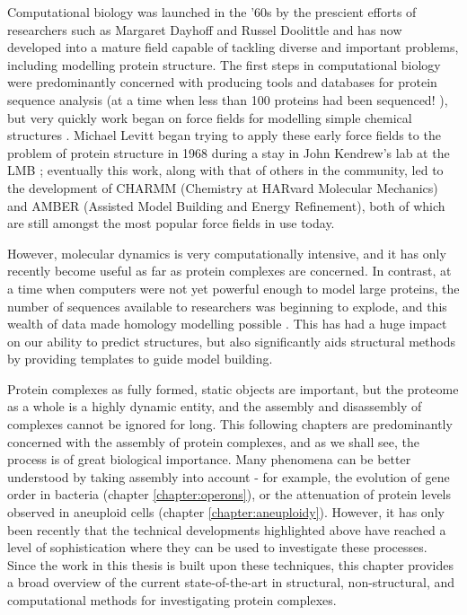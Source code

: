 \documentclass[a4paper,11pt,twoside,openright]{scrbook}
\begin{document}
Computational biology was launched in the '60s by the prescient efforts of researchers such as Margaret Dayhoff and Russel Doolittle and has now developed into a mature field capable of tackling diverse and important problems, including modelling protein structure. The first steps in computational biology were predominantly concerned with producing tools and databases for protein sequence analysis (at a time when less than 100 proteins had been sequenced! \cite{Dayhoff1965}), but very quickly work began on force fields for modelling simple chemical structures \cite{Bixon1967}. Michael Levitt began trying to apply these early force fields to the problem of protein structure in 1968 during a stay in John Kendrew's lab at the LMB \cite{Levitt2001}; eventually this work, along with that of others in the community, led to the development of CHARMM \cite{Brooks2009} (Chemistry at HARvard Molecular Mechanics) and AMBER \cite{Salomon-Ferrer2013,Amber2017} (Assisted Model Building and Energy Refinement), both of which are still amongst the most popular force fields in use today.

However, molecular dynamics is very computationally intensive, and it has only recently become useful as far as protein complexes are concerned. In contrast, at a time when computers were not yet powerful enough to model large proteins, the number of sequences available to researchers was beginning to explode, and this wealth of data made homology modelling possible \cite{Rost1996,Xu1998}. This has had a huge impact on our ability to predict structures, but also significantly aids structural methods by providing templates to guide model building.

Protein complexes as fully formed, static objects are important, but the proteome as a whole is a highly dynamic entity, and the assembly and disassembly of complexes cannot be ignored for long. This following chapters are predominantly concerned with the assembly of protein complexes, and as we shall see, the process is of great biological importance. Many phenomena can be better understood by taking assembly into account - for example, the evolution of gene order in bacteria (chapter \ref{chapter:operons}), or the attenuation of protein levels observed in aneuploid cells (chapter \ref{chapter:aneuploidy}). However, it has only been recently that the technical developments highlighted above have reached a level of sophistication where they can be used to investigate these processes. Since the work in this thesis is built upon these techniques, this chapter provides a broad overview of the current state-of-the-art in structural, non-structural, and computational methods for investigating protein complexes.
\end{document}
